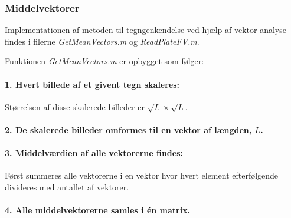 \subsubsection{Middelvektorer}

Implementationen af metoden til tegngenkendelse ved hjælp af vektor analyse findes i filerne \textit{GetMeanVectors.m} og \textit{ReadPlateFV.m}.

Funktionen \textit{GetMeanVectors.m} er opbygget som følger:


\paragraph{1. Hvert billede af et givent tegn skaleres:} Størrelsen af disse skalerede billeder er $\sqrt{L} \times \sqrt{L}$.

\paragraph{2. De skalerede billeder omformes til en vektor af længden, $L$.}

\paragraph{3. Middelværdien af alle vektorerne findes:} Først summeres alle vektorerne i en vektor hvor hvert element efterfølgende divideres med antallet af vektorer.

\paragraph{4. Alle middelvektorerne samles i én matrix.}


